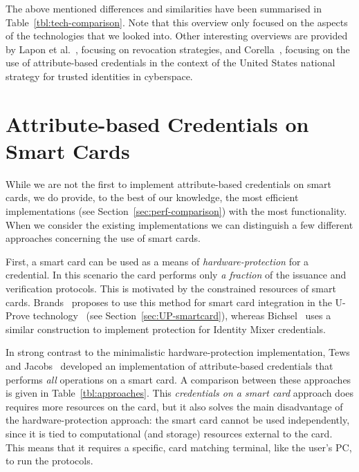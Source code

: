 The above mentioned differences and similarities have been summarised in
Table~\ref{tbl:tech-comparison}. Note that this overview only focused on the
aspects of the technologies that we looked into. Other interesting overviews are
provided by Lapon et al.~\cite{LaponKDN2011,Lapon2012}, focusing on revocation
strategies, and Corella~\cite{Corella2011a,Corella2011b}, focusing on the use
of attribute-based credentials in the context of the United States national
strategy for trusted identities in cyberspace.

\section{Attribute-based Credentials on Smart Cards}

While we are not the first to implement attribute-based credentials on smart
cards, we do provide, to the best of our knowledge, the most efficient
implementations (see Section~\ref{sec:perf-comparison}) with the most
functionality. When we consider the existing implementations we can distinguish
a few different approaches concerning the use of smart cards.

First, a smart card can be used as a means of \emph{hardware-protection} for a
credential. In this scenario the card performs only \emph{a fraction} of the
issuance and verification protocols. This is motivated by the constrained
resources of smart cards. Brands~\cite[Chapter 6]{Brands2000} proposes to use
this method for smart card integration in the U-Prove
technology~\cite{U-Prove_Overview2011} (see Section~\ref{sec:UP-smartcard}),
whereas Bichsel~\cite{Bichsel2007} uses a similar construction to implement
protection for Identity Mixer credentials.

In strong contrast to the minimalistic hardware-protection implementation, Tews
and Jacobs~\cite{TewsJacobs09} developed an implementation of attribute-based
credentials that performs \emph{all} operations on a smart card. A comparison
between these approaches is given in Table~\ref{tbl:approaches}. This
\emph{credentials on a smart card} approach does requires more resources on the
card, but it also solves the main disadvantage of the hardware-protection
approach: the smart card cannot be used independently, since it is tied to
computational (and storage) resources external to the card. This means that it
requires a specific, card matching terminal, like the user's PC, to run
the protocols.

